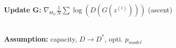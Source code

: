 \textbf{Update G:} $\nabla_{\Theta_G} \frac{1}{N}\sum \log(D(G(z^{(i)})))$ (ascent)\\

\\

\textbf{Assumption:} capacity, $D \rightarrow D^*$, opti. $p_{model}$\\

